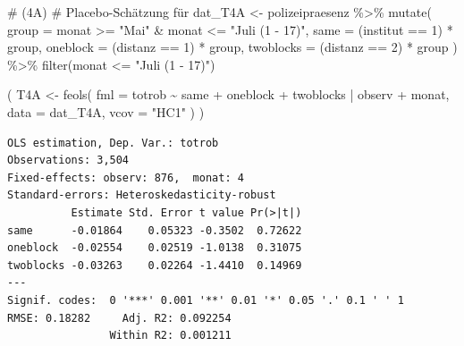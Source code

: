 \documentclass[
  a4paper,
  DIV=11,
  oneside]{scrreprt}
\newenvironment{Shaded}{\begin{snugshade}}{\end{snugshade}}
\newcommand{\AttributeTok}[1]{\textcolor[rgb]{0.40,0.45,0.13}{#1}}
\newcommand{\CommentTok}[1]{\textcolor[rgb]{0.37,0.37,0.37}{#1}}
\newcommand{\DecValTok}[1]{\textcolor[rgb]{0.68,0.00,0.00}{#1}}
\newcommand{\FunctionTok}[1]{\textcolor[rgb]{0.28,0.35,0.67}{#1}}
\newcommand{\NormalTok}[1]{\textcolor[rgb]{0.00,0.23,0.31}{#1}}
\newcommand{\OtherTok}[1]{\textcolor[rgb]{0.00,0.23,0.31}{#1}}
\newcommand{\SpecialCharTok}[1]{\textcolor[rgb]{0.37,0.37,0.37}{#1}}
\newcommand{\StringTok}[1]{\textcolor[rgb]{0.13,0.47,0.30}{#1}}
\begin{document}
\begin{Shaded}
\begin{Highlighting}[]
\CommentTok{\# (4A)}
\CommentTok{\# Placebo{-}Schätzung für }
\NormalTok{dat\_T4A }\OtherTok{\textless{}{-}}\NormalTok{ polizeipraesenz }\SpecialCharTok{\%\textgreater{}\%}
  \FunctionTok{mutate}\NormalTok{(}
    \AttributeTok{group =}\NormalTok{ monat }\SpecialCharTok{\textgreater{}=} \StringTok{"Mai"} \SpecialCharTok{\&}\NormalTok{ monat }\SpecialCharTok{\textless{}=} \StringTok{"Juli (1 {-} 17)"}\NormalTok{,}
    \AttributeTok{same =}\NormalTok{ (institut }\SpecialCharTok{==} \DecValTok{1}\NormalTok{) }\SpecialCharTok{*}\NormalTok{ group,}
    \AttributeTok{oneblock =}\NormalTok{ (distanz }\SpecialCharTok{==} \DecValTok{1}\NormalTok{) }\SpecialCharTok{*}\NormalTok{ group,}
    \AttributeTok{twoblocks =}\NormalTok{ (distanz }\SpecialCharTok{==} \DecValTok{2}\NormalTok{) }\SpecialCharTok{*}\NormalTok{ group}
\NormalTok{  ) }\SpecialCharTok{\%\textgreater{}\%} 
  \FunctionTok{filter}\NormalTok{(monat }\SpecialCharTok{\textless{}=} \StringTok{"Juli (1 {-} 17)"}\NormalTok{)}

\NormalTok{(}
\NormalTok{  T4A }\OtherTok{\textless{}{-}} \FunctionTok{feols}\NormalTok{(}
    \AttributeTok{fml =}\NormalTok{ totrob }\SpecialCharTok{\textasciitilde{}} 
\NormalTok{      same }\SpecialCharTok{+}
\NormalTok{      oneblock }\SpecialCharTok{+}
\NormalTok{      twoblocks }
    \SpecialCharTok{|}\NormalTok{ observ }\SpecialCharTok{+}\NormalTok{ monat, }
    \AttributeTok{data =}\NormalTok{ dat\_T4A, }
    \AttributeTok{vcov =} \StringTok{"HC1"}
\NormalTok{  )}
\NormalTok{)}
\end{Highlighting}
\end{Shaded}

\begin{verbatim}
OLS estimation, Dep. Var.: totrob
Observations: 3,504
Fixed-effects: observ: 876,  monat: 4
Standard-errors: Heteroskedasticity-robust 
          Estimate Std. Error t value Pr(>|t|) 
same      -0.01864    0.05323 -0.3502  0.72622 
oneblock  -0.02554    0.02519 -1.0138  0.31075 
twoblocks -0.03263    0.02264 -1.4410  0.14969 
---
Signif. codes:  0 '***' 0.001 '**' 0.01 '*' 0.05 '.' 0.1 ' ' 1
RMSE: 0.18282     Adj. R2: 0.092254
                Within R2: 0.001211
\end{verbatim}
\end{document}
